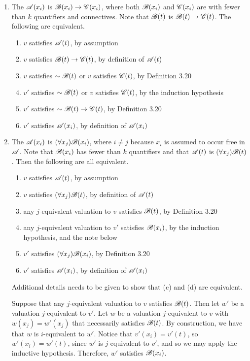 \begin{proposition}
\begin{enumerate}
    \item The \wf{} \(\mathscr{A}(x_i)\) is \(\mathscr{B}(x_i) \rightarrow \mathscr{C}(x_i)\), where both \(\mathscr{B}(x_i)\) and \(\mathscr{C}(x_i)\) are \wfs{} with fewer than \(k\) quantifiers and connectives. Note that \(\mathscr{B}(t)\) is \(\mathscr{B}(t) \rightarrow \mathscr{C}(t)\). The following are equivalent.
      \begin{enumerate}
        \item \(v\) satisfies \(\mathscr{A}(t)\), by assumption
        \item \(v\) satisfies \(\mathscr{B}(t) \rightarrow \mathscr{C}(t)\), by definition of \(\mathscr{A}(t)\)
        \item \(v\) satisfies \(\sim\mathscr{B}(t)\) or \(v\) satisfies \(\mathscr{C}(t)\), by Definition 3.20
        \item \(v'\) satisfies \(\sim\mathscr{B}(t)\) or \(v\) satisfies \(\mathscr{C}(t)\), by the induction hypothesis
        \item \(v'\) satisfies \(\sim\mathscr{B}(t) \rightarrow \mathscr{C}(t)\), by Definition 3.20
        \item \(v'\) satisfies \(\mathscr{A}(x_i)\), by definition of \(\mathscr{A}(x_i)\)
      \end{enumerate}

    \item The \wf{} \(\mathscr{A}(x_i)\) is \((\forall x_j)\mathscr{B}(x_i)\), where \(i \neq j\) because \(x_i\) is assumed to occur free in \(\mathscr{A}\). Note that \(\mathscr{B}(x_i)\) has fewer than \(k\) quantifiers and that \(\mathscr{A}(t)\) is \((\forall x_j)\mathscr{B}(t)\). Then the following are all equivalent.
      \begin{enumerate}
        \item \(v\) satisfies \(\mathscr{A}(t)\), by assumption
        \item \(v\) satisfies \((\forall x_j)\mathscr{B}(t)\), by definition of \(\mathscr{A}(t)\)
        \item any \(j\)-equivalent valuation to \(v\) satisfies \(\mathscr{B}(t)\), by Definition 3.20
        \item any \(j\)-equivalent valuation to \(v'\) satisfies \(\mathscr{B}(x_i)\), by the induction hypothesis, and the note below
        \item \(v'\) satisfies \((\forall x_j)\mathscr{B}(x_i)\), by Definition 3.20
        \item \(v'\) satisfies \(\mathscr{A}(x_i)\), by definition of \(\mathscr{A}(x_i)\)
      \end{enumerate}
      Additional details needs to be given to show that (c) and (d) are equivalent.

      \Ra{} Suppose that any \(j\)-equivalent valuation to \(v\) satisfies \(\mathscr{B}(t)\). Then let \(w'\) be a valuation \(j\)-equivalent to \(v'\). Let \(w\) be a valuation \(j\)-equivalent to \(v\) with \(w(x_j) = w'(x_j)\) that necessarily satisfies \(\mathscr{B}(t)\). By construction, we have that \(w\) is \(i\)-equivalent to \(w'\). Notice that \(v'(x_i) = v'(t)\), so \(w'(x_i) = w'(t)\), since \(w'\) is \(j\)-equivalent to \(v'\), and so we may apply the inductive hypothesis. Therefore, \(w'\) satisfies \(\mathscr{B}(x_i)\).


\end{enumerate}
\end{proposition}
